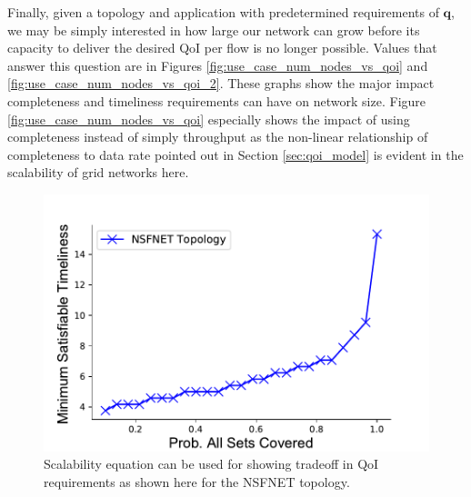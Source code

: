 Finally, given a topology and application with predetermined requirements of $\mathbf{q}$, we may be simply interested in how large our network can grow before its capacity to deliver the desired QoI per flow is no longer possible.  Values that answer this question are in Figures \ref{fig:use_case_num_nodes_vs_qoi} and \ref{fig:use_case_num_nodes_vs_qoi_2}.  These graphs show the major impact completeness and timeliness requirements can have on network size. Figure \ref{fig:use_case_num_nodes_vs_qoi} especially shows the impact of using completeness instead of simply throughput as the non-linear relationship of completeness to data rate pointed out in Section \ref{sec:qoi_model} is evident in the scalability of grid networks here.

\begin{figure}
\centering	
    \includegraphics[scale=0.5, clip=true, trim=0mm 0mm 0mm 0mm]{figures/use_cases_examples/nsf_net/prob_sets_cov_vs_tness.pdf}
    \caption{Scalability equation can be used for showing tradeoff in QoI requirements as shown here for the NSFNET topology. }
    \label{fig:use_case_tness_vs_num_nodes}
\end{figure}




